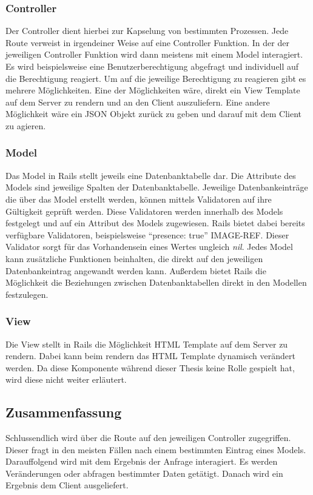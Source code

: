 \documentclass[11pt]{article}
\newcommand{\hlnote}[2]{#1}
\newcommand{\hlnote}[2]{\todo{#2}\texthl{#1}}
\begin{document}
	\subsubsection{Controller}
	\label{sec: rails_controller}
	Der Controller dient hierbei zur Kapselung von bestimmten Prozessen. Jede Route verweist in irgendeiner Weise auf eine Controller Funktion. In der der jeweiligen Controller Funktion wird dann meistens mit einem Model interagiert. Es wird beispielsweise eine Benutzerberechtigung abgefragt und individuell auf die Berechtigung reagiert. Um auf die jeweilige Berechtigung zu reagieren gibt es mehrere Möglichkeiten. Eine der Möglichkeiten wäre, direkt ein View Template auf dem Server zu rendern und an den Client auszuliefern. Eine andere Möglichkeit wäre ein \gls{JSON} Objekt zurück zu geben und darauf mit dem Client zu agieren.
	
	\subsubsection{Model}
	\label{sec: rails_model}
	Das Model in Rails stellt jeweils eine Datenbanktabelle dar. Die Attribute des Models sind jeweilige Spalten der Datenbanktabelle. Jeweilige Datenbankeinträge die über das Model erstellt werden, können mittels Validatoren auf ihre Gültigkeit geprüft werden. Diese Validatoren werden innerhalb des Models festgelegt und auf ein Attribut des Models zugewiesen. Rails bietet dabei bereits verfügbare Validatoren, beispielsweise \enquote{presence: true} \hlnote{IMAGE-REF}{Bild Referenz}. Dieser Validator sorgt für das Vorhandensein eines Wertes ungleich \textit{nil}. Jedes Model kann zusätzliche Funktionen beinhalten, die direkt auf den jeweiligen Datenbankeintrag angewandt werden kann. Außerdem bietet Rails die Möglichkeit die Beziehungen zwischen Datenbanktabellen direkt in den Modellen festzulegen.
	
	\subsubsection{View}
	\label{sec: rails_view}
	Die View stellt in Rails die Möglichkeit \gls{HTML} Template auf dem Server zu rendern. Dabei kann beim rendern das \gls{HTML} Template dynamisch verändert werden. Da diese Komponente während dieser Thesis keine Rolle gespielt hat, wird diese nicht weiter erläutert.
	
	\subsection{Zusammenfassung}
	\label{sec: rails_resuemee}
	Schlussendlich wird über die Route auf den jeweiligen Controller zugegriffen. Dieser fragt in den meisten Fällen nach einem bestimmten Eintrag eines Models. Darauffolgend wird mit dem Ergebnis der Anfrage interagiert. Es werden Veränderungen oder abfragen bestimmter Daten getätigt. Danach wird ein Ergebnis dem Client ausgeliefert.
	
\end{document}
